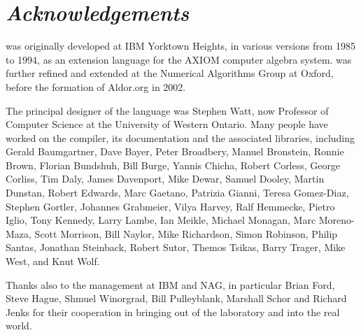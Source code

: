 \chapter*{\textit{Acknowledgements}}

\asharp{} was originally developed at IBM Yorktown Heights,
in various versions from 1985 to 1994, as an extension language 
for the AXIOM computer algebra system.
\asharp{} was further refined and extended at 
the Numerical Algorithms Group at Oxford,
before the formation of Aldor.org in 2002.

The principal designer of the language was Stephen Watt, 
now Professor of Computer Science at the University of Western Ontario.
Many people have worked on the compiler, its documentation and the associated
libraries, including
Gerald Baumgartner,
Dave Bayer,
Peter Broadbery,
Manuel Bronstein,
Ronnie Brown,
Florian Bundshuh,
Bill Burge,
Yannis Chicha,
Robert Corless,
George Corliss,
Tim Daly,
James Davenport,
Mike Dewar,
Samuel Dooley,
Martin Dunstan,
Robert Edwards,
Marc Gaetano,
Patrizia Gianni,
Teresa Gomez-Diaz,
Stephen Gortler,
Johannes Grabmeier,
Vilya Harvey,
Ralf Hemmecke,
Pietro Iglio,
Tony Kennedy,
Larry Lambe,
Ian Meikle,
Michael Monagan,
Marc Moreno-Maza,
Scott Morrison,
Bill Naylor,
Mike Richardson,
Simon Robinson,
Philip Santas,
Jonathan Steinback,
Robert Sutor,
Themos Tsikas,
Barry Trager,
Mike West,
and 
Knut Wolf.

Thanks also to the management at IBM and NAG, in particular Brian Ford,
Steve Hague, Shmuel Winorgrad, Bill Pulleyblank, Marshall Schor 
and Richard Jenks for their cooperation in bringing \asharp{} 
out of the laboratory and into the real world.
